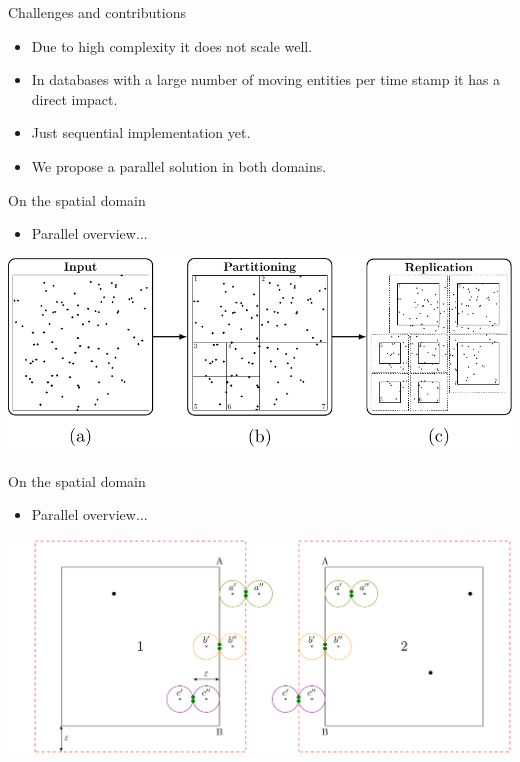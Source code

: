 \documentclass{beamer}
\begin{document}
    \begin{frame}{Challenges and contributions}
        \begin{itemize}
            \item Due to high complexity it does not scale well.
            \item In databases with a large number of moving entities per time stamp it has a direct impact.
            \item Just sequential implementation yet.
            \item We propose a parallel solution in both domains.
        \end{itemize}
    \end{frame}

    \begin{frame}{On the spatial domain}{}
        \begin{itemize} \item Parallel overview... \end{itemize} \vspace{0.5cm}

         \centering
         \includegraphics[width=\textwidth]{../thesis/chapter4/figures/PartReplication/P123}
     \end{frame}

     \begin{frame}{On the spatial domain}
        \begin{itemize} \item Parallel overview... \end{itemize} \vspace{0.5cm}

         \centering
         \includegraphics[width=\textwidth]{../thesis/chapter4/figures/merge}
     \end{frame}
\end{document}
